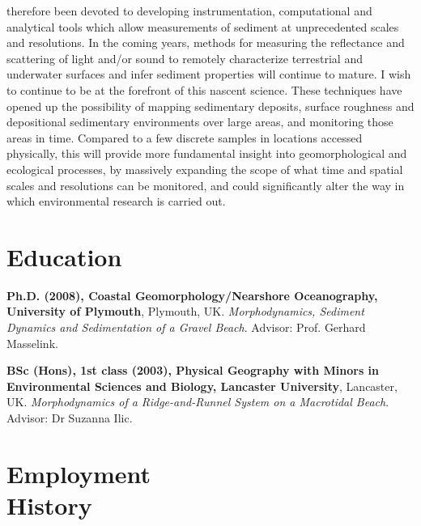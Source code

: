 \documentclass[margin,line]{resume}
\begin{document}
\begin{resume}
\begin{footnotesize}
therefore been devoted to developing instrumentation, computational and analytical tools which
allow measurements of sediment at unprecedented scales and resolutions. In the coming years,
methods for measuring the reflectance and scattering of light and/or sound to remotely
characterize terrestrial and underwater surfaces and infer sediment properties will continue to
mature. I wish to continue to be at the forefront of this nascent science. These techniques have
opened up the possibility of mapping sedimentary deposits, surface roughness and depositional
sedimentary environments over large areas, and monitoring those areas in time. Compared to a
few discrete samples in locations accessed physically, this will provide more fundamental insight
into geomorphological and ecological processes, by massively expanding the scope of what time
and spatial scales and resolutions can be monitored, and could significantly alter the way in
which environmental research is carried out.
     \end{footnotesize}

    \section{\mysidestyle Education}
    \begin{footnotesize}

    {\bf Ph.D. (2008), Coastal Geomorphology/Nearshore Oceanography, University of Plymouth}, Plymouth, UK. {\sl Morphodynamics, Sediment Dynamics and Sedimentation of a Gravel Beach}. Advisor:  Prof. Gerhard Masselink.\vspace{2mm}

    {\bf BSc (Hons), 1st class (2003), Physical Geography with Minors in Environmental Sciences and Biology, Lancaster University}, Lancaster, UK.  {\sl Morphodynamics of a Ridge-and-Runnel System on a Macrotidal Beach}. Advisor:  Dr Suzanna Ilic. \vspace{2mm}
     \end{footnotesize}

    \section{\mysidestyle Employment\\History}
    \begin{footnotesize}


\end{footnotesize}
\end{resume}
\end{document}
